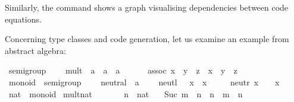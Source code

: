 \begin{isabellebody}
\begin{isamarkuptext}
  Similarly, the \hyperlink{command.code-deps}{\mbox{}} command shows a graph
  visualising dependencies between code equations.%
\end{isamarkuptext}%
\isamarkuptrue%
%
\isamarkuptrue%
%
\begin{isamarkuptext}%
Concerning type classes and code generation, let us examine an example
  from abstract algebra:%
\end{isamarkuptext}%
\isamarkuptrue%
%
\isadelimquote
%
\endisadelimquote
%
\isatagquote
{}\isamarkupfalse%
\ semigroup\ {\isacharequal}\isanewline
\ \ \ mult\ {\isacharcolon}{\isacharcolon}\ {\isachardoublequoteopen}{\isacharprime}a\ {\isasymRightarrow}\ {\isacharprime}a\ {\isasymRightarrow}\ {\isacharprime}a{\isachardoublequoteclose}\ {\isacharparenleft}\ {\isachardoublequoteopen}{\isasymotimes}{\isachardoublequoteclose}\ {}{}{\isacharparenright}\isanewline
\ \ \ assoc{\isacharcolon}\ {\isachardoublequoteopen}{\isacharparenleft}x\ {\isasymotimes}\ y{\isacharparenright}\ {\isasymotimes}\ z\ {\isacharequal}\ x\ {\isasymotimes}\ {\isacharparenleft}y\ {\isasymotimes}\ z{\isacharparenright}{\isachardoublequoteclose}\isanewline
\isanewline
{}\isamarkupfalse%
\ monoid\ {\isacharequal}\ semigroup\ {\isacharplus}\isanewline
\ \ \ neutral\ {\isacharcolon}{\isacharcolon}\ {\isacharprime}a\ {\isacharparenleft}{\isachardoublequoteopen}{\isasymone}{\isachardoublequoteclose}{\isacharparenright}\isanewline
\ \ \ neutl{\isacharcolon}\ {\isachardoublequoteopen}{\isasymone}\ {\isasymotimes}\ x\ {\isacharequal}\ x{\isachardoublequoteclose}\isanewline
\ \ \ \ \ neutr{\isacharcolon}\ {\isachardoublequoteopen}x\ {\isasymotimes}\ {\isasymone}\ {\isacharequal}\ x{\isachardoublequoteclose}\isanewline
\isanewline
{}\isamarkupfalse%
\ nat\ {\isacharcolon}{\isacharcolon}\ monoid\isanewline
{}\isanewline
\isanewline
{}\isamarkupfalse%
\ mult{\isacharunderscore}nat\ \isanewline
\ \ \ \ {\isachardoublequoteopen}{}\ {\isasymotimes}\ n\ {\isacharequal}\ {\isacharparenleft}{}{\isasymColon}nat{\isacharparenright}{\isachardoublequoteclose}\isanewline
\ \ {\isacharbar}\ {\isachardoublequoteopen}Suc\ m\ {\isasymotimes}\ n\ {\isacharequal}\ n\ {\isacharplus}\ m\ {\isasymotimes}\ n{\isachardoublequoteclose}\isanewline

\end{isabellebody}
